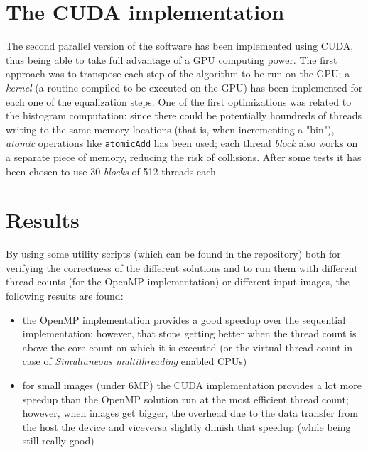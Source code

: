 \documentclass[10pt,twocolumn,letterpaper]{article}
\begin{document}
\section{The CUDA implementation}

The second parallel version of the software has been implemented using CUDA, thus being
able to take full advantage of a GPU computing power. The first approach was to transpose
each step of the algorithm to be run on the GPU; a \emph{kernel} (a routine compiled to be
executed on the GPU) has been implemented for each one of the equalization steps.
One of the first optimizations was related to the histogram computation: since there could
be potentially houndreds of threads writing to the same memory locations (that is, when
incrementing a "bin"), \emph{atomic} operations like \verb|atomicAdd| has been used; each
thread \emph{block} also works on a separate piece of memory, reducing the risk of collisions.
After some tests it has been chosen to use 30 \emph{blocks} of 512 threads each.

\section{Results}

By using some utility scripts (which can be found in the repository) both for verifying
the correctness of the different solutions and to run them with different thread counts
(for the OpenMP implementation) or different input images, the following results are found:

\begin{itemize}
    \item the OpenMP implementation provides a good speedup over the sequential implementation;
          however, that stops getting better when the thread count is above the core count on
          which it is executed (or the virtual thread count in case of \emph{Simultaneous
          multithreading} enabled CPUs)
    \item for small images (under 6MP) the CUDA implementation provides a lot more speedup
          than the OpenMP solution run at the most efficient thread count; however, when images
          get bigger, the overhead due to the data transfer from the host the device and
          viceversa slightly dimish that speedup (while being still really good)
\end{itemize}

\newpage

\nocite{*}
 

\end{document}
